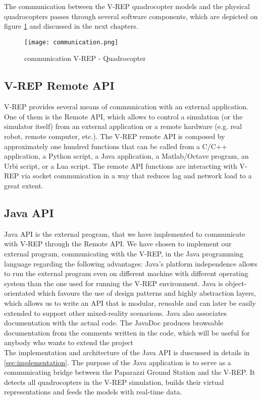 The communication between the V-REP quadrocopter models and the physical quadrocopters passes through several software components, which are depicted on figure \ref{fig:communication} and discussed in the next chapters.

\begin{figure}[h!]
 \begin{center}
  \texttt{[image: communication.png]}
 \end{center}
  \caption{communication V-REP - Quadrocopter\label{fig:communication}}
\end{figure}

\subsection{V-REP Remote API}
V-REP provides several means of communication with an external application. One of them is the Remote API, which allows to control a simulation (or the simulator itself) from an external application or a remote hardware (e.g. real robot, remote computer, etc.). The V-REP remote API is composed by approximately one hundred functions that can be called from a C/C++ application, a Python script, a Java application, a Matlab/Octave program, an Urbi script, or a Lua script. The remote API functions are interacting with V-REP via socket communication in a way that reduces lag and network load to a great extent.

\subsection{Java API}
Java API is the external program, that we have implemented to communicate with V-REP through the Remote API.
We have chosen to implement our external program, communicating with the V-REP, in the Java programming language regarding the following advantages: Java's platform independence allows to run the external program even on different machine with different operating system than the one used for running the V-REP environment.  Java is object-orientated which favours the use of design patterns and highly abstraction layers, which allows us to write an API that is modular, reusable and can later be easily extended to support other mixed-reality scenarious. Java also associates documentation with the actual code. The JavaDoc produces browsable documentation from the comments written in the code, which will be useful for anybody who wants to extend the project\\
The implementation and architecture of the Java API is duscussed in details in \ref{sec:implementation}. The purpose of the Java application is to serve as a communicating bridge between the Paparazzi Ground Station and the V-REP. It detects all quadrocopters in the V-REP simulation, builds their virtual representations and feeds the models with real-time data.

